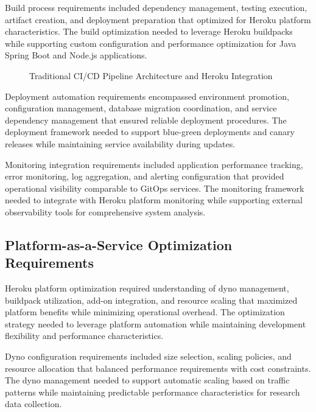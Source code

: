 Build process requirements included dependency management, testing execution, artifact creation, and deployment preparation that optimized for Heroku platform characteristics. The build optimization needed to leverage Heroku buildpacks while supporting custom configuration and performance optimization for Java Spring Boot and Node.js applications.

\begin{figure}[H]
\centering
\caption{Traditional CI/CD Pipeline Architecture and Heroku Integration}
\label{fig:traditional-cicd-pipeline}
\end{figure}

Deployment automation requirements encompassed environment promotion, configuration management, database migration coordination, and service dependency management that ensured reliable deployment procedures. The deployment framework needed to support blue-green deployments and canary releases while maintaining service availability during updates.

Monitoring integration requirements included application performance tracking, error monitoring, log aggregation, and alerting configuration that provided operational visibility comparable to GitOps services. The monitoring framework needed to integrate with Heroku platform monitoring while supporting external observability tools for comprehensive system analysis.

\subsection{Platform-as-a-Service Optimization Requirements}

Heroku platform optimization required understanding of dyno management, buildpack utilization, add-on integration, and resource scaling that maximized platform benefits while minimizing operational overhead. The optimization strategy needed to leverage platform automation while maintaining development flexibility and performance characteristics.

Dyno configuration requirements included size selection, scaling policies, and resource allocation that balanced performance requirements with cost constraints. The dyno management needed to support automatic scaling based on traffic patterns while maintaining predictable performance characteristics for research data collection.

